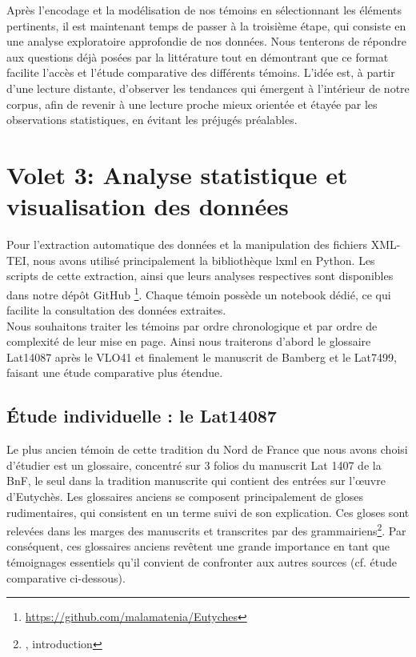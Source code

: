 \documentclass[a4paper, twoside, 12pt]{book}
\begin{document}
{Après l'encodage et la modélisation de nos témoins en sélectionnant les éléments pertinents, il est maintenant temps de passer à la troisième étape, qui consiste en une analyse exploratoire approfondie de nos données. Nous tenterons de répondre aux questions déjà posées par la littérature tout en démontrant que ce format facilite l'accès et l'étude comparative des différents témoins. L'idée est, à partir d'une lecture distante, d'observer les tendances qui émergent à l'intérieur de notre corpus, afin de revenir à une lecture proche mieux orientée et étayée par les observations statistiques, en évitant les préjugés préalables. 

\section{Volet 3: Analyse statistique et visualisation des données}

Pour l'extraction automatique des données et la manipulation des fichiers XML-TEI, nous avons utilisé principalement la bibliothèque lxml en Python. Les scripts de cette extraction, ainsi que leurs analyses respectives sont disponibles dans notre dépôt GitHub \footnote{\url{https://github.com/malamatenia/Eutyches}}. Chaque témoin possède un notebook dédié, ce qui facilite la consultation des données extraites.\\

Nous souhaitons traiter les témoins par ordre chronologique et par ordre de complexité de leur mise en page. Ainsi nous traiterons d'abord le glossaire Lat14087 après le VLO41 et finalement le manuscrit de Bamberg et le Lat7499, faisant une étude comparative plus étendue. \\

\subsection{Étude individuelle : le Lat14087}

Le plus ancien témoin de cette \og{}tradition du Nord de France\fg{} que nous avons choisi d'étudier est un glossaire, concentré sur 3 folios du manuscrit Lat 1407 de la BnF, le seul dans la tradition manuscrite qui contient des entrées sur l'œuvre d'Eutychès. Les glossaires anciens se composent principalement de gloses rudimentaires, qui consistent en un terme suivi de son explication. Ces gloses sont relevées dans les marges des manuscrits et transcrites par des grammairiens\footnote{\cite{hamesse1996manuscrits}, introduction}. Par conséquent, ces glossaires anciens revêtent une grande importance en tant que témoignages essentiels qu'il convient de confronter aux autres sources (cf. étude comparative ci-dessous).\\

}
\end{document}

